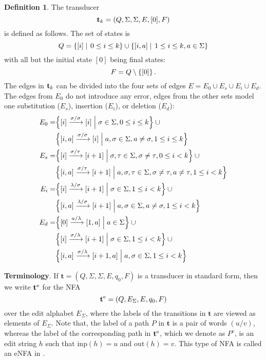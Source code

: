 \documentclass{article}
\theoremstyle{plain}
\theoremstyle{definition}
\newtheorem{definition}[theorem]{Definition}
\theoremstyle{remark}
\newcommand{\sm}{\setminus}
\newcommand{\sett}[2]{\left\{#1\mathrel{\left|
	\vphantom{#1}\vphantom{#2}\right.}#2\right\}}
\newcommand{\bsett}[2]{\Bigl\{#1\mathrel{\Bigl|\Bigr.}#2\Bigr\}}
\newcommand{\set}[1]{\left\{\mathinner{#1}\right\}}
\newcommand{\xra}[1]{\xrightarrow{#1}}
\newcommand{\e}{\lambda}
\newcommand\tsid{\trt_{k}}
\newcommand\dsid{\ensuremath{\delta}\xspace}
\newcommand{\epath}{P^{\mathrm{e}}}
\newcommand\al{\Sigma}        \newcommand\alG{\Gamma}        \newcommand\eew{(\e/\e)}        \newcommand\ealph{E_\al}   \newcommand\aut{\mathbf{a}}   \newcommand\autb{\mathbf{b}}   \newcommand\tr{\mathbf{t}}    \newcommand\sz[1]{|#1|}       \newcommand\weight[1]{\mathrm{weight}(#1)}       \newcommand\ch{\gamma}        \newcommand\chid{\mathrm{id}} \newcommand\chsid{\mathrm{sid}} \newcommand\dist{\dsid}               \newcommand\inp{\mathrm{inp}}
\newcommand\out{\mathrm{out}}
\newcommand\pmsn{\par\medskip\noindent}
\begin{document}
\begin{definition}\label{def:tr}
The transducer
$$\tsid = (Q,\al,\al,E,[0],F)$$
is defined as follows. The set of states is
\[
	Q = \sett{[i]}{0\le i\le k}\cup \sett{[i,a]}{1\le i\le k, a\in \Sigma}
\]
with all but the initial state $[0]$ being final states: $$F = Q\sm\set{[0]}.$$
The edges in $\tsid$ can be divided into the four sets of edges $E = E_0 \cup E_s \cup E_i \cup E_d$.
The edges from $E_0$ do not introduce any error, edges from the other sets model one substitution ($E_s$), insertion ($E_i$), or deletion ($E_d$):
\begin{align}
	E_0 = &\bsett{[i] \xra{\sigma\slash \sigma}[i]}{\sigma\in\Sigma, 0\le i\le k} \cup {} \label{eq:nerr1} \\
		&\bsett{[i,a] \xra{\sigma\slash\sigma}[i]}{a,\sigma\in\Sigma,a\neq \sigma,1\le i\le k} \label{eq:nerr2} \\
	E_s = &\bsett{[i] \xra{\sigma\slash\tau}[i+1]}{\sigma,\tau\in\Sigma,\sigma\neq \tau,0\le i < k} \cup {} \label{eq:sub1} \\
		&\bsett{[i,a] \xra{\sigma\slash \tau}[i+1]}{a,\sigma,\tau\in\Sigma,\sigma\neq \tau,a\neq \tau,1\le i < k} \label{eq:sub2} \\
	E_i = &\bsett{[i] \xra{\e\slash \sigma}[i+1]}{\sigma\in\Sigma,1\le i< k} \cup {} \label{eq:ins1} \\
		&\bsett{[i,a] \xra{\e\slash \sigma}[i+1]}{a,\sigma\in\Sigma,a\neq \sigma,1\le i < k} \label{eq:ins2} \\
	E_d = &\bsett{[0] \xra{a\slash \e}[1,a]}{a\in\Sigma} \cup {} \label{eq:del0} \\
		&\bsett{[i] \xra{\sigma\slash \e}[i+1]}{\sigma\in\Sigma,1\le i< k} \cup {} \label{eq:del1} \\
		&\bsett{[i,a] \xra{\sigma\slash\e}[i+1,a]}{a,\sigma\in\Sigma,1\le i < k} \label{eq:del2}
\end{align}
\end{definition}
\pmsn \textbf{Terminology}. If $\tr=(Q,\al,\al,E,q_0,F)$ is a transducer in standard form, then we write $\mathbf{t}^{\mathrm{e}}$ for the NFA $$\etr=(Q,\ealph,E,q_0,F)$$
over the edit alphabet $\ealph$, where the labels of
the transitions in $\tr$ are viewed as elements of $\ealph$. Note that, the label of a path $P$ in $\tr$ is a pair of words $(u/v)$, whereas the label of the
corresponding path in $\mathbf{t}^{\mathrm{e}}$, which we denote as $\epath$, is an edit string
$h$ such that $\inp(h)=u$ and $\out(h)=v$.
This type
of NFA is called an eNFA in \cite{KaKo:2004}.
\end{document}
